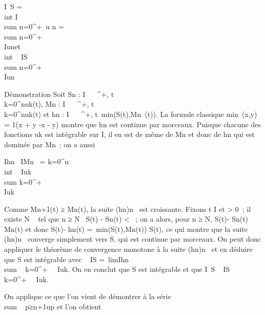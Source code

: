 \int  I~S =\\int
 I \\sum
n=0^+\infty~u n = \\sum
n=0^+\infty~\\\int
  Iun\text et
\\int  ~
I\textbar{}S\textbar{}\leq\\sum
n=0^+\infty~\\\int
  I\textbar{}un\textbar{}

Démonstration Soit Sn : I \rightarrow~ ~^+,
t\mapsto~\\\sum
 k=0^nuk(t), Mn : I \rightarrow~
~^+,
t\mapsto~\\\sum
 k=0^n\textbar{}uk(t)\textbar{} et
hn : I \rightarrow~ ~^+,
t\mapsto~min(\textbar{}S(t)\textbar{},Mn~(t)).
La formule classique min~(x,y) =
1(x + y -\textbar{}x - y\textbar{}) montre que
hn est continue par morceaux. Puisque chacune des fonctions
\textbar{}uk\textbar{} est intégrable sur I, il en est de même
de Mn et donc de hn qui est dominée par
Mn~; on a aussi

\int  Ihn~
\leq\int  IMn~ =
\sum k=0^n~
\\int  ~
I\textbar{}uk\textbar{}\leq\\sum
k=0^+\infty~\\\int
  I\textbar{}uk\textbar{}

Comme Mn+1(t) ≥ Mn(t), la suite
(hn)n\in{}~ est croissante. Fixons t \in I et \epsilon
\textgreater{} 0~; il existe N \in {}~ tel que n ≥ N \rigtharrow~\textbar{}S(t) -
Sn(t)\textbar{} \textless{} \epsilon~; on a alors, pour n ≥ N,
\textbar{}S(t)\textbar{}- \epsilon \leq\textbar{}Sn(t)\textbar{}\leq
Mn(t) et donc \textbar{}S(t)\textbar{}- \epsilon \leq hn(t)
=\
min(\textbar{}S(t)\textbar{},Mn(t))
\leq\textbar{}S(t)\textbar{}, ce qui montre que la suite
(hn)n\in{}~ converge simplement vers
\textbar{}S\textbar{}, qui est continue par morceaux. On peut donc
appliquer le théorème de convergence monotone à la suite
(hn)n\in{}~ et en déduire que \textbar{}S\textbar{} est
intégrable avec \int ~
I\textbar{}S\textbar{} =\
lim\int  Ihn~
\leq\\sum ~
k=0^+\infty~\int ~
I\textbar{}uk\textbar{}. On en conclut que S est
intégrable et que \left
\textbar{}\int  I~S\right
\textbar{}\leq\int ~
I\textbar{}S\textbar{}\leq\\\sum
 k=0^+\infty~\int ~
I\textbar{}uk\textbar{}.

On applique ce que l'on vient de démontrer à la série
\\sum ~
p≥n+1up et l'on obtient

